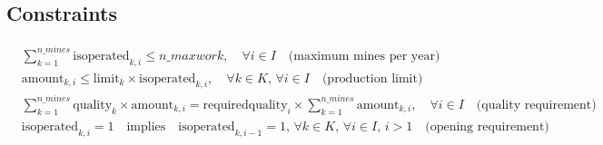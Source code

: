 \documentclass{article}
\begin{document}
\subsection*{Constraints}
\begin{align*}
& \sum_{k=1}^{n\_mines} \text{isoperated}_{k,i} \leq n\_maxwork, \quad \forall i \in I \quad \text{(maximum mines per year)} \\
& \text{amount}_{k,i} \leq \text{limit}_{k} \times \text{isoperated}_{k,i}, \quad \forall k \in K, \, \forall i \in I \quad \text{(production limit)} \\
& \sum_{k=1}^{n\_mines} \text{quality}_{k} \times \text{amount}_{k,i} = \text{requiredquality}_{i} \times \sum_{k=1}^{n\_mines} \text{amount}_{k,i}, \quad \forall i \in I \quad \text{(quality requirement)} \\
& \text{isoperated}_{k,i} = 1 \quad \text{implies} \quad \text{isoperated}_{k,i-1} = 1, \, \forall k \in K, \, \forall i \in I, \, i > 1 \quad \text{(opening requirement)}
\end{align*}
\end{document}
